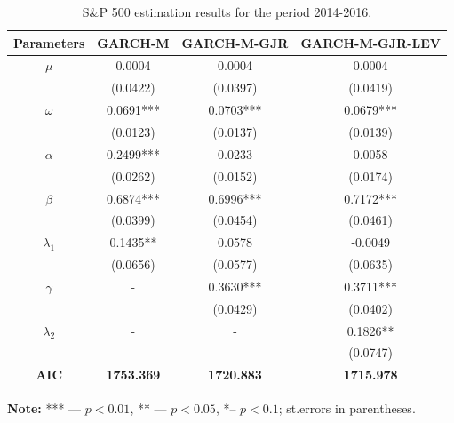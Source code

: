 \documentclass[authoryear, 1p]{elsarticle}
\numberwithin{equation}{section}
\begin{document}
\begin{table}[h!]
\begin{center}
\caption{S\&P 500 estimation results for the period 2014-2016.}
\label{tab:tab_10}
\begin{tabular*}{\textwidth}{cccc}
\hline
\hline
\textbf{Parameters} & \textbf{GARCH-M}  & \textbf{GARCH-M-GJR} & \textbf{GARCH-M-GJR-LEV} \\
\hline
\hline
$\mu$                  & 0.0004            & 0.0004               & 0.0004                   \\
                    & (0.0422)          & (0.0397)             & (0.0419)                 \\
$\omega$               & 0.0691***         & 0.0703***            & 0.0679***                \\
                    & (0.0123)          & (0.0137)             & (0.0139)                 \\
$\alpha$               & 0.2499***         & 0.0233               & 0.0058                   \\
                    & (0.0262)          & (0.0152)             & (0.0174)                 \\
$\beta$                & 0.6874***         & 0.6996***            & 0.7172***                \\
                    & (0.0399)          & (0.0454)             & (0.0461)                 \\
$\lambda_{1}$              & 0.1435**          & 0.0578               & -0.0049                  \\
                    & (0.0656)          & (0.0577)             & (0.0635)                 \\
$\gamma$               & -                 & 0.3630***            & 0.3711***                \\
                    &                   & (0.0429)             & (0.0402)                 \\
$\lambda_{2}$           & -                 & -                    & 0.1826**                 \\
                    &                   &                      & (0.0747)        \\
\hline
\textbf{AIC}        & \textbf{1753.369} & \textbf{1720.883}    & \textbf{1715.978}        \\
\hline
\hline
\end{tabular*}
\end{center}
\footnotesize
\renewcommand{\baselineskip}{11pt}
\textbf{Note:} *** —  $p<0.01$, ** —  $p < 0.05$, *– $p < 0.1$; st.errors in parentheses.
\end{table}
\end{document}
